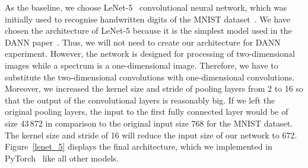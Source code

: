As the baseline, we choose LeNet-5~\cite{lecun1998} convolutional neural network,
which was initially used to recognise handwritten digits of the MNIST dataset~\cite{lecun1998}.
We have chosen the architecture of LeNet-5
because it is the simplest model used in the DANN paper~\cite{ganin2016}.
Thus, we will not need to create our architecture for DANN experiment.
However, the network is designed for processing of two-dimensional images
while a spectrum is a one-dimensional image.
Therefore, we have to substitute the two-dimensional convolutions with one-dimensional convolutions.
Moreover, we increased the kernel size and stride of pooling layers from 2 to 16
so that the output of the convolutional layers is reasonably big.
If we left the original pooling layers,
the input to the first fully connected layer would be of size 43\,872
in comparison to the original input size 768 for the MNIST dataset.
The kernel size and stride of 16 will reduce the input size of our network to 672.
Figure~\ref{lenet_5} displays the final architecture,
which we implemented in PyTorch~\cite{paszke2019} like all other models.

